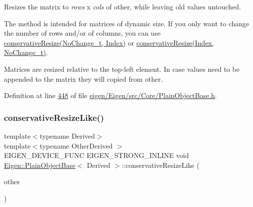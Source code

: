 Resizes the matrix to {\itshape rows} x {\itshape cols} of {\ttfamily other}, while leaving old values untouched.

The method is intended for matrices of dynamic size. If you only want to change the number of rows and/or of columns, you can use \hyperlink{class_eigen_1_1_plain_object_base_a46afa73816539b0fe36c6e9abd7978a6}{conservative\+Resize(\+No\+Change\+\_\+t, Index)} or \hyperlink{class_eigen_1_1_plain_object_base_a528879aef40f9cbc4ab4925e4a6bceb9}{conservative\+Resize(\+Index, No\+Change\+\_\+t)}.

Matrices are resized relative to the top-\/left element. In case values need to be appended to the matrix they will copied from {\ttfamily other}. 

Definition at line \hyperlink{eigen_2_eigen_2src_2_core_2_plain_object_base_8h_source_l00448}{448} of file \hyperlink{eigen_2_eigen_2src_2_core_2_plain_object_base_8h_source}{eigen/\+Eigen/src/\+Core/\+Plain\+Object\+Base.\+h}.

\mbox{\label{class_eigen_1_1_plain_object_base_a7775d274035c4ef541aa0fc9a3ad30a2}} 
\subsubsection{\texorpdfstring{conservative\+Resize\+Like()}{conservativeResizeLike()}\hspace{0.1cm}{\footnotesize\ttfamily [2/2]}}
{\footnotesize\ttfamily template$<$typename Derived$>$ \\
template$<$typename Other\+Derived $>$ \\
E\+I\+G\+E\+N\+\_\+\+D\+E\+V\+I\+C\+E\+\_\+\+F\+U\+NC E\+I\+G\+E\+N\+\_\+\+S\+T\+R\+O\+N\+G\+\_\+\+I\+N\+L\+I\+NE void \hyperlink{class_eigen_1_1_plain_object_base}{Eigen\+::\+Plain\+Object\+Base}$<$ Derived $>$\+::conservative\+Resize\+Like (\begin{DoxyParamCaption}\item[{const \hyperlink{group___core___module_class_eigen_1_1_dense_base}{Dense\+Base}$<$ Other\+Derived $>$ \&}]{other }\end{DoxyParamCaption})\hspace{0.3cm}{\ttfamily [inline]}}

